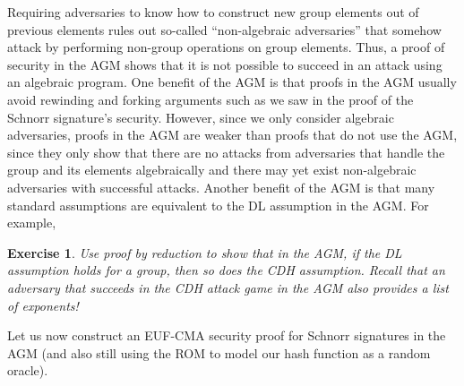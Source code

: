 \documentclass[12pt]{article}
\newtheorem{exercise}{Exercise}
\theoremstyle{definition}
\theoremstyle{remark}
\theoremstyle{definition}
\begin{document}
Requiring adversaries to know how to construct new group elements out of previous elements rules out so-called ``non-algebraic adversaries'' that somehow attack by performing non-group operations on group elements. Thus, a proof of security in the AGM shows that it is not possible to succeed in an attack using an algebraic program. One benefit of the AGM is that proofs in the AGM usually avoid rewinding and forking arguments such as we saw in the proof of the Schnorr signature's security. However, since we only consider algebraic adversaries, proofs in the AGM are weaker than proofs that do not use the AGM, since they only show that there are no attacks from adversaries that handle the group and its elements algebraically and there may yet exist non-algebraic adversaries with successful attacks. Another benefit of the AGM is that many standard assumptions are equivalent to the DL assumption in the AGM. For example,

\begin{exercise}
Use proof by reduction to show that in the AGM, if the DL assumption holds for a group, then so does the CDH assumption. Recall that an adversary that succeeds in the CDH attack game in the AGM also provides a list of exponents!
\end{exercise}

Let us now construct an EUF-CMA security proof for Schnorr signatures in the AGM (and also still using the ROM to model our hash function as a random oracle).
\end{document}
